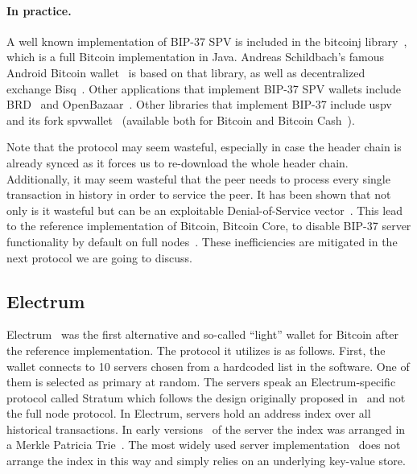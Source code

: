 

\paragraph{In practice.} A well known implementation of BIP-37 SPV is included in the bitcoinj library~\cite{bitcoinj}, which is a full Bitcoin implementation in Java. Andreas Schildbach's famous Android Bitcoin wallet~\cite{schildbach} is based on that library, as well as decentralized exchange Bisq~\cite{bisq}. Other applications that implement BIP-37 SPV wallets include BRD~\cite{brd} and OpenBazaar~\cite{openbazaar}. Other libraries that implement BIP-37 include uspv~\cite{uspv} and its fork spvwallet~\cite{spvwallet} (available both for Bitcoin and Bitcoin Cash~\cite{bch-spv}).

Note that the protocol may seem wasteful, especially in case the header chain is already synced as it forces us to re-download the whole header chain. Additionally, it may seem wasteful that the peer needs to process every single transaction in history in order to service the peer. It has been shown that not only is it wasteful but can be an exploitable Denial-of-Service vector~\cite{todd-bip37-attack}. This lead to the reference implementation of Bitcoin, Bitcoin Core, to disable BIP-37 server functionality by default on full nodes~\cite{bip37-disable}. These inefficiencies are mitigated in the next protocol we are going to discuss.


\subsection{Electrum}
\label{utxo-electrum}
Electrum~\cite{electrum} was the first alternative and so-called ``light'' wallet for Bitcoin after the reference implementation.
The protocol it utilizes is as follows. First, the wallet connects to 10 servers chosen from a hardcoded list in the software. One of them is selected as primary at random. The servers speak an Electrum-specific protocol called Stratum which follows the design originally proposed in~\cite{stratum} and not the full node protocol.
In Electrum, servers hold an address index over all historical transactions. In early versions~\cite{electrumserver} of the server the index was arranged in a Merkle Patricia Trie~\cite{ultimate}. The most widely used server implementation~\cite{electrumserverrust} does not arrange the index in this way and simply relies on an underlying key-value store.

